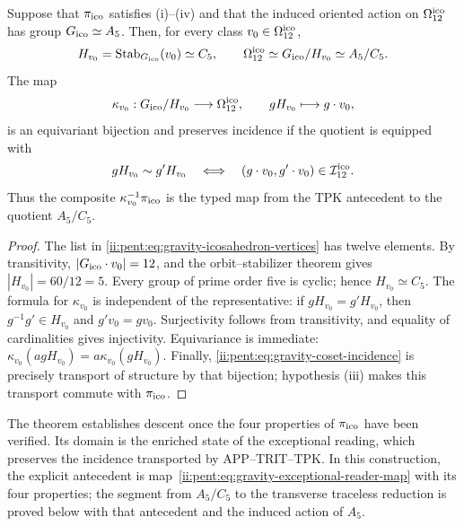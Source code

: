 


\begin{theorem}
\label{ii:pent:thm:gravity-exceptional-descent}
Suppose that \(\pi_{\rm ico}\) satisfies (i)--(iv) and that the induced
oriented action on \(\Omega_{12}^{\rm ico}\) has group
\(G_{\rm ico}\simeq A_5\). Then, for every class
\(v_0\in\Omega_{12}^{\rm ico}\),
\begin{equation}
\label{ii:pent:eq:gravity-icosahedral-quotient}
H_{v_0}=\operatorname{Stab}_{G_{\rm ico}}(v_0)\simeq C_5,
\qquad
\Omega_{12}^{\rm ico}\simeq G_{\rm ico}/H_{v_0}\simeq A_5/C_5.
\end{equation}
The map
\begin{equation}
\label{ii:pent:eq:gravity-coset-map}
\kappa_{v_0}:G_{\rm ico}/H_{v_0}\longrightarrow\Omega_{12}^{\rm ico},
\qquad gH_{v_0}\longmapsto g\cdot v_0,
\end{equation}
is an equivariant bijection and preserves incidence if the quotient
is equipped with
\begin{equation}
\label{ii:pent:eq:gravity-coset-incidence}
gH_{v_0}\sim g'H_{v_0}
\quad\Longleftrightarrow\quad
(g\cdot v_0,g'\cdot v_0)\in\mathcal I_{12}^{\rm ico}.
\end{equation}
Thus the composite \(\kappa_{v_0}^{-1}\pi_{\rm ico}\) is the
typed map from the TPK antecedent to the quotient \(A_5/C_5\).
\end{theorem}

\begin{proof}
The list in \eqref{ii:pent:eq:gravity-icosahedron-vertices} has twelve elements.
By transitivity, \(|G_{\rm ico}\cdot v_0|=12\), and the
orbit--stabilizer theorem gives \(|H_{v_0}|=60/12=5\). Every group of
prime order five is cyclic; hence \(H_{v_0}\simeq C_5\). The formula for
\(\kappa_{v_0}\) is independent of the representative: if
\(gH_{v_0}=g'H_{v_0}\), then \(g^{-1}g'\in H_{v_0}\) and
\(g'v_0=gv_0\). Surjectivity follows from transitivity, and
equality of cardinalities gives injectivity. Equivariance is immediate:
\(\kappa_{v_0}(agH_{v_0})=a\kappa_{v_0}(gH_{v_0})\). Finally,
\eqref{ii:pent:eq:gravity-coset-incidence} is precisely transport of
structure by that bijection; hypothesis (iii) makes this
transport commute with \(\pi_{\rm ico}\).
\end{proof}

The theorem establishes descent once the four properties of
\(\pi_{\rm ico}\) have been verified. Its domain is the enriched state
of the exceptional reading, which preserves the incidence transported by
APP--TRIT--TPK. In this construction, the explicit antecedent is
map~\eqref{ii:pent:eq:gravity-exceptional-reader-map} with its four
properties; the segment from \(A_5/C_5\) to the transverse traceless
reduction is proved below with that antecedent and the induced action
of \(A_5\).

